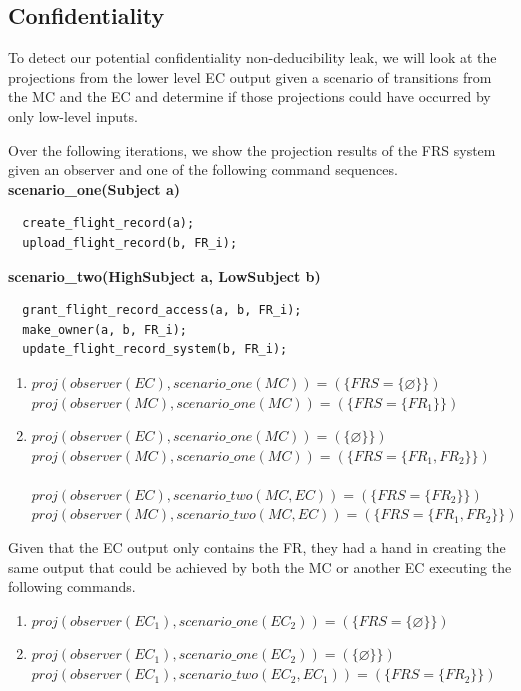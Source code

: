 \documentclass[10pt,journal,compsoc]{IEEEtran}
\begin{document}
\subsection{Confidentiality}

To detect our potential confidentiality non-deducibility leak, we will look at the projections from the lower level EC output given a scenario of transitions from the MC and the EC and determine if those projections could have occurred by only low-level inputs.

Over the following iterations, we show the projection results of the FRS system given an observer and one of the following command sequences. \\

\textbf{scenario\_one(Subject a)}
\begin{lstlisting}
  create_flight_record(a);
  upload_flight_record(b, FR_i);
\end{lstlisting}  

\textbf{scenario\_two(HighSubject a, LowSubject b)}
\begin{lstlisting}
  grant_flight_record_access(a, b, FR_i);
  make_owner(a, b, FR_i);
  update_flight_record_system(b, FR_i);
\end{lstlisting}  
  
\begin{enumerate}
  \item $proj(observer (EC),scenario\_one(MC)) = (\{FRS = \{\varnothing\}\})$ \\
  $proj(observer (MC),scenario\_one(MC)) = (\{FRS = \{FR_1\}\})$ \\

  \item $proj(observer (EC),scenario\_one(MC)) = (\{\varnothing\}\})$ \\
  $proj(observer (MC),scenario\_one(MC)) = (\{FRS = \{FR_1, FR_2\}\})$ \\\\

  $proj(observer (EC),scenario\_two(MC, EC)) = (\{FRS = \{FR_2\}\})$ \\
  $proj(observer (MC),scenario\_two(MC, EC)) = (\{FRS = \{FR_1, FR_2\}\})$ \\
\end{enumerate}


Given that the EC output only contains the FR, they had a hand in creating the same output that could be achieved by both the MC or another EC executing the following commands. 

\begin{enumerate}
  \item $proj(observer (EC_1),scenario\_one(EC_2)) = (\{FRS = \{\varnothing\}\})$ \\
  \item $proj(observer (EC_1),scenario\_one(EC_2)) = (\{\varnothing\}\})$ \\
  $proj(observer (EC_1),scenario\_two(EC_2, EC_1)) = (\{FRS = \{FR_2\}\})$ \\
\end{enumerate}
\end{document}
